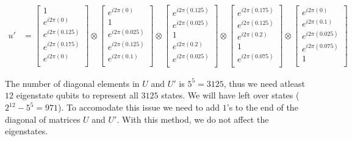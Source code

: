 \documentclass[msc,oneside]{ubcthesis}
\begin{document}
	\begin{align*}	
	u' & = \begin{bmatrix}
		1 \\
		e^{i2\pi(0)} \\
		e^{i2\pi(0.125)} \\
		e^{i2\pi(0.175)} \\
		e^{i2\pi(0)} \\
	\end{bmatrix} 
	\otimes \begin{bmatrix}
		e^{i2\pi(0)} \\
		1 \\
		e^{i2\pi(0.025)} \\
		e^{i2\pi(0.125)} \\
		e^{i2\pi(0.1)} \\
	\end{bmatrix}
	\otimes \begin{bmatrix}
		e^{i2\pi(0.125)} \\
		e^{i2\pi(0.025)} \\
		1\\
		e^{i2\pi(0.2)} \\
		e^{i2\pi(0.025)} \\
	\end{bmatrix} 
	\otimes \begin{bmatrix}
		e^{i2\pi(0.175)} \\
		e^{i2\pi(0.125)} \\
		e^{i2\pi(0.2)} \\
		1 \\
		e^{i2\pi(0.075)} \\
	\end{bmatrix} 
	\otimes \begin{bmatrix}
		e^{i2\pi(0)} \\
		e^{i2\pi(0.1)} \\
		e^{i2\pi(0.025)} \\
		e^{i2\pi(0.075)} \\
		1 \\
	\end{bmatrix} 							 			
\end{align*}
	

	
	The number of diagonal elements in $U$ and $U'$ is $5^5 = 3125$, thus we need atleast $12$ eigenstate qubits to represent all $3125$ states. We will have left over states ($2^{12} - 5^5 = 971$). To accomodate this issue we need to add $1$'s to the end of the diagonal of matrices $U$ and $U'$. With this method, we do not affect the eigenstates.
	
\end{document}
